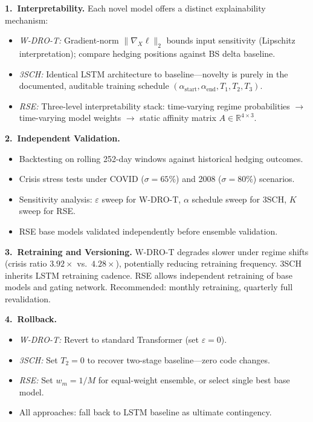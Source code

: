 \documentclass[11pt]{article}
\newcommand{\R}{\mathbb{R}}
\begin{document}
\textbf{1.\ Interpretability.}  Each novel model offers a distinct explainability mechanism:
\begin{itemize}[noitemsep]
    \item \textit{W-DRO-T:} Gradient-norm $\|\nabla_X\ell\|_2$ bounds input sensitivity (Lipschitz interpretation); compare hedging positions against BS delta baseline.
    \item \textit{3SCH:} Identical LSTM architecture to baseline---novelty is purely in the documented, auditable training schedule $(\alpha_{\mathrm{start}}, \alpha_{\mathrm{end}}, T_1, T_2, T_3)$.
    \item \textit{RSE:} Three-level interpretability stack: time-varying regime probabilities $\to$ time-varying model weights $\to$ static affinity matrix $A \in \R^{4 \times 3}$.
\end{itemize}

\textbf{2.\ Independent Validation.}
\begin{itemize}[noitemsep]
    \item Backtesting on rolling 252-day windows against historical hedging outcomes.
    \item Crisis stress tests under COVID ($\sigma=65\%$) and 2008 ($\sigma=80\%$) scenarios.
    \item Sensitivity analysis: $\varepsilon$ sweep for W-DRO-T, $\alpha$ schedule sweep for 3SCH, $K$ sweep for RSE.
    \item RSE base models validated independently before ensemble validation.
\end{itemize}

\textbf{3.\ Retraining and Versioning.}
W-DRO-T degrades slower under regime shifts (crisis ratio $3.92\times$ vs.\ $4.28\times$), potentially reducing retraining frequency.  3SCH inherits LSTM retraining cadence.  RSE allows independent retraining of base models and gating network.  Recommended: monthly retraining, quarterly full revalidation.

\textbf{4.\ Rollback.}
\begin{itemize}[noitemsep]
    \item \textit{W-DRO-T:} Revert to standard Transformer (set $\varepsilon=0$).
    \item \textit{3SCH:} Set $T_2=0$ to recover two-stage baseline---zero code changes.
    \item \textit{RSE:} Set $w_m = 1/M$ for equal-weight ensemble, or select single best base model.
    \item All approaches: fall back to LSTM baseline as ultimate contingency.
\end{itemize}
\end{document}
